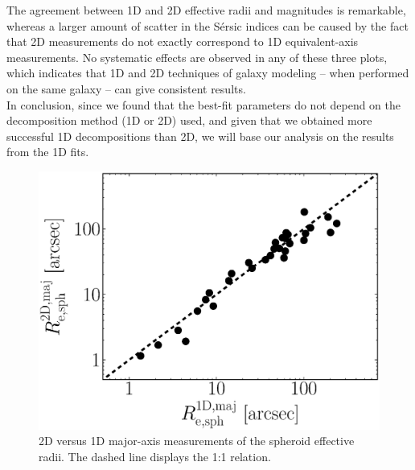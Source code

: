\documentclass[preprint2]{emulateapj}
\begin{document}
The agreement between 1D and 2D effective radii and magnitudes is remarkable, 
whereas a larger amount of scatter in the S\'ersic indices can be caused by the fact that 
2D measurements do not exactly correspond to 1D equivalent-axis measurements. 
No systematic effects are observed in any of these three plots, 
which indicates that 1D and 2D techniques of galaxy modeling -- when performed on the same galaxy -- 
can give consistent results. \\
In conclusion, since we found that the best-fit parameters do not depend on the decomposition method (1D or 2D) used, 
and given that we obtained more successful 1D decompositions than 2D, 
we will base our analysis on the results from the 1D fits.


\begin{figure}[h]
\begin{center}
\includegraphics[width=\columnwidth]{images/comparison_r_e.eps} 
\caption{2D versus 1D major-axis measurements of the spheroid effective radii. 
The dashed line displays the 1:1 relation.}
\label{fig:re1d2d}
\end{center}
\end{figure}
\end{document}
